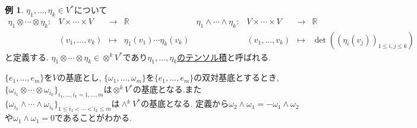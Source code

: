 \documentclass[dvipdfmx,a4paper,11pt]{article}
\newcommand{\R}{\mathbb{R}}
\theoremstyle{definition}
\newtheorem{exa}[thm]{例}
\begin{document}
    \begin{exa}
 $\eta_1, \ldots, \eta_k \in V^{*}$について
     $$
      \begin{matrix}
     \eta_1\otimes \cdots \otimes \eta_k  : &V \times \cdots \times V & \rightarrow &\R &
     \eta_1\wedge \cdots \wedge \eta_k  : &V \times \cdots \times V & \rightarrow &\R \\
      &(v_1, \ldots, v_k)& \mapsto& \eta_1(v_1)\cdots \eta_{k}(v_k) & &(v_1, \ldots, v_k)& \mapsto& \det((\eta_i(v_j))_{1 \le i,j \le k})
       \end{matrix}
      $$
    と定義する. $\eta_1\otimes \cdots \otimes \eta_k \in \otimes^{k} V^{*}$であり\underline{$\eta_1, \ldots, \eta_k$のテンソル積}と呼ばれる. 

$\{ e_1, \ldots, e_m\}$を$V$の基底とし, $\{ \omega_1, \ldots, \omega_m\}$を$\{ e_1, \ldots, e_m\}$の双対基底とするとき, $\{ \omega_{i_1}\otimes \cdots \otimes  \omega_{i_k}\}_{i_1, \ldots, i_k=1, \ldots,m}$は$\otimes^{k} V^{*}$の基底となる.また$\{ \omega_{i_1}\wedge \cdots \wedge \omega_{i_k}\}_{1 \le i_1< \cdots < i_k\le m}$は$\wedge^{k} V^{*}$の基底となる.
定義から$\omega_2 \wedge \omega_1 = -\omega_1 \wedge \omega_2$や$\omega_1 \wedge \omega_1 = 0$であることがわかる.
\end{exa}
    
\end{document}
